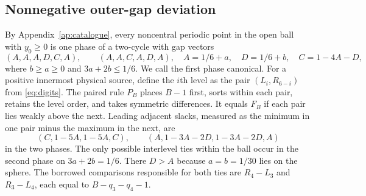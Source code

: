 \documentclass[11pt,reqno]{amsart}
\theoremstyle{remark}
\begin{document}
\subsection{Nonnegative outer-gap deviation}
By Appendix~\ref{ap:catalogue}, every noncentral periodic point in the open ball with \(y_0\ge0\) is one phase of a two-cycle with gap vectors
\begin{equation}\label{eq:two}
 (A,A,A,D,C,A),\qquad(A,A,C,A,D,A),
 \quad A=1/6+a,\quad D=1/6+b,\quad C=1-4A-D,
\end{equation}
where \(b\ge a\ge0\) and \(3a+2b\le1/6\). We call the first phase canonical. For a positive innermost physical source, define the \(i\)th level as the pair \((L_i,R_{6-i})\) from \eqref{eq:digits}. The paired rule \(P_B\) places \(B-1\) first, sorts within each pair, retains the level order, and takes symmetric differences. It equals \(F_B\) if each pair lies weakly above the next. Leading adjacent slacks, measured as the minimum in one pair minus the maximum in the next, are
\[
 (C,1-5A,1-5A,C),\qquad(A,1-3A-2D,1-3A-2D,A)
\]
in the two phases. The only possible interlevel ties within the ball occur in the second phase on \(3a+2b=1/6\). There \(D>A\) because \(a=b=1/30\) lies on the sphere. The borrowed comparisons responsible for both ties are \(R_4-L_3\) and \(R_3-L_4\), each equal to \(B-q_3-q_4-1\).
\end{document}
